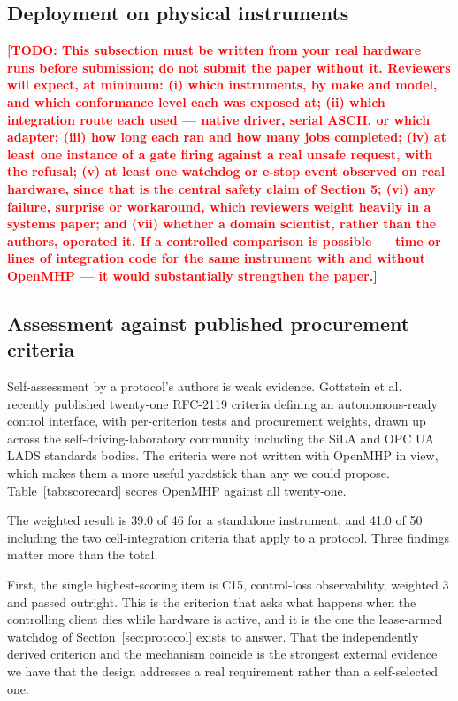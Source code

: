\documentclass[11pt]{article}
\newcommand{\TODO}[1]{\textcolor{red}{\textbf{[TODO: #1]}}}
\begin{document}
\subsection{Deployment on physical instruments}
\TODO{This subsection must be written from your real hardware runs before submission; do not
submit the paper without it. Reviewers will expect, at minimum: (i) which instruments, by
make and model, and which conformance level each was exposed at; (ii) which integration route
each used --- native driver, serial ASCII, or which adapter; (iii) how long each ran and how
many jobs completed; (iv) at least one instance of a gate firing against a real unsafe
request, with the refusal; (v) at least one watchdog or e-stop event observed on real
hardware, since that is the central safety claim of Section 5; (vi) any failure, surprise or
workaround, which reviewers weight heavily in a systems paper; and (vii) whether a domain
scientist, rather than the authors, operated it. If a controlled comparison is possible ---
time or lines of integration code for the same instrument with and without OpenMHP --- it
would substantially strengthen the paper.}

\subsection{Assessment against published procurement criteria}
\label{sec:scorecard}

Self-assessment by a protocol's authors is weak evidence. Gottstein et al.~\cite{gottstein2026}
recently published twenty-one RFC-2119 criteria defining an autonomous-ready control
interface, with per-criterion tests and procurement weights, drawn up across the
self-driving-laboratory community including the SiLA and OPC UA LADS standards bodies. The
criteria were not written with OpenMHP in view, which makes them a more useful yardstick than
any we could propose. Table~\ref{tab:scorecard} scores OpenMHP against all twenty-one.

The weighted result is 39.0 of 46 for a standalone instrument, and 41.0 of 50 including the
two cell-integration criteria that apply to a protocol. Three findings matter more than the
total.

First, the single highest-scoring item is C15, control-loss observability, weighted 3 and
passed outright. This is the criterion that asks what happens when the controlling client
dies while hardware is active, and it is the one the lease-armed watchdog of
Section~\ref{sec:protocol} exists to answer. That the independently derived criterion and the
mechanism coincide is the strongest external evidence we have that the design addresses a
real requirement rather than a self-selected one.
\end{document}
